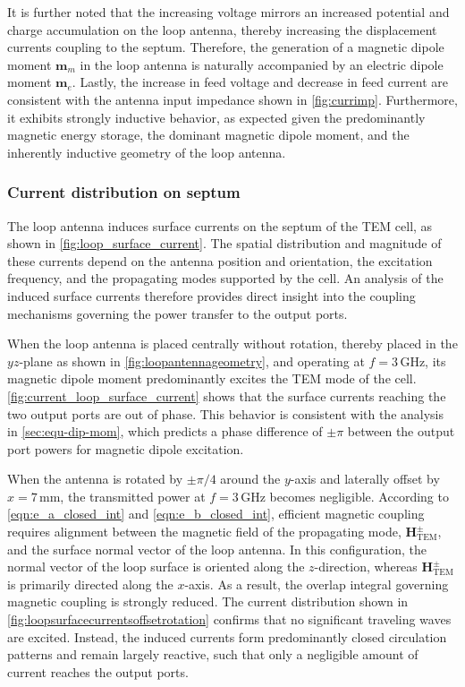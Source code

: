 It is further noted that the increasing voltage mirrors an increased potential and charge accumulation on the loop antenna, thereby increasing the displacement currents coupling to the septum. Therefore, the generation of a magnetic dipole moment $\mathbf{m}_m$ in the loop antenna is naturally accompanied by an electric dipole moment $\mathbf{m}_e$. Lastly, the increase in feed voltage and decrease in feed current are consistent with the antenna input impedance shown in \autoref{fig:currimp}. Furthermore, it exhibits strongly inductive behavior, as expected given the predominantly magnetic energy storage, the dominant magnetic dipole moment, and the inherently inductive geometry of the loop antenna.

\subsubsection{Current distribution on septum}\label{sec:current_dist_septum_loop}

The loop antenna induces surface currents on the septum of the TEM cell, as shown in \autoref{fig:loop_surface_current}. The spatial distribution and magnitude of these currents depend on the antenna position and orientation, the excitation frequency, and the propagating modes supported by the cell. An analysis of the induced surface currents therefore provides direct insight into the coupling mechanisms governing the power transfer to the output ports.

When the loop antenna is placed centrally without rotation, thereby placed in the $yz$-plane as shown in \autoref{fig:loopantennageometry}, and operating at $f=3\,\mathrm{GHz}$, its magnetic dipole moment predominantly excites the TEM mode of the cell. \autoref{fig:current_loop_surface_current} shows that the surface currents reaching the two output ports are out of phase. This behavior is consistent with the analysis in \cref{sec:equ-dip-mom}, which predicts a phase difference of $\pm\pi$ between the output port powers for magnetic dipole excitation.

When the antenna is rotated by $\pm\pi/4$ around the $y$-axis and laterally offset by $x=7\,\mathrm{mm}$, the transmitted power at $f=3\,\mathrm{GHz}$ becomes negligible. According to \eqref{eqn:e_a_closed_int} and \eqref{eqn:e_b_closed_int}, efficient magnetic coupling requires alignment between the magnetic field of the propagating mode, $\mathbf{H}_\mathrm{TEM}^\pm$, and the surface normal vector of the loop antenna. In this configuration, the normal vector of the loop surface is oriented along the $z$-direction, whereas $\mathbf{H}_\mathrm{TEM}^\pm$ is primarily directed along the $x$-axis. As a result, the overlap integral governing magnetic coupling is strongly reduced. The current distribution shown in \autoref{fig:loopsurfacecurrentsoffsetrotation} confirms that no significant traveling waves are excited. Instead, the induced currents form predominantly closed circulation patterns and remain largely reactive, such that only a negligible amount of current reaches the output ports.

